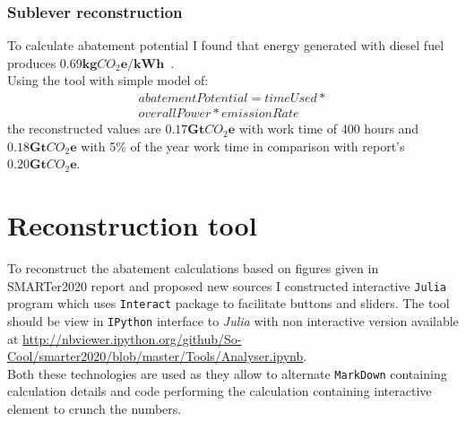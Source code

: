 \documentclass[11pt, twocolumn]{article}
\begin{document}
\subsubsection{Sublever reconstruction\label{sec:off-grid:reconstruction}}
To calculate abatement potential I found that energy generated with diesel fuel produces $\mathbf{0.69kg}CO_2\mathbf{e}/\mathbf{kWh}$~\citep{iea2012co2}.\\
Using the tool with simple model of:\\
\begin{gather*}
  abatementPotential = timeUsed *\\
  overallPower * emissionRate
\end{gather*}
the reconstructed values are $\mathbf{0.17} \mathbf{Gt}CO_2\mathbf{e}$ with work time of 400 hours and $\mathbf{0.18} \mathbf{Gt}CO_2\mathbf{e}$ with 5\% of the year work time in comparison with report's $\mathbf{0.20} \mathbf{Gt}CO_2\mathbf{e}$.




\section{Reconstruction tool}
To reconstruct the abatement calculations based on figures given in SMARTer2020 report and proposed new sources I constructed interactive \texttt{Julia} program which uses \texttt{Interact} package to facilitate buttons and sliders. The tool should be view in \texttt{IPython} interface to \emph{Julia} with non interactive version available at \url{http://nbviewer.ipython.org/github/So-Cool/smarter2020/blob/master/Tools/Analyser.ipynb}.\\
Both these technologies are used as they allow to alternate \texttt{MarkDown} containing calculation details and code performing the calculation containing interactive element to crunch the numbers.
\end{document}
